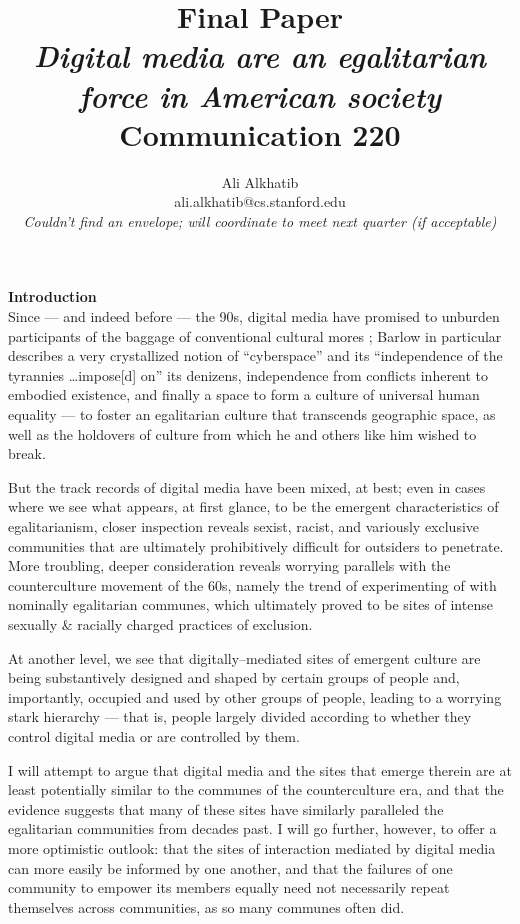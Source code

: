 \documentclass[11pt,titlepage]{article}
\author{
  Ali Alkhatib\\
  ali.alkhatib@cs.stanford.edu\\
  \textit{Couldn't find an envelope; will coordinate to meet next quarter (if acceptable)}
}
\title{Final Paper\\
\normalsize{
  \textit{Digital media are an egalitarian force in American society}\\
  Communication 220
  }
}
\newcommand{\sectitle}[1]{\textbf{#1}\\}
\begin{document}
\maketitle

\sectitle{Introduction}
Since --- and indeed before ---
the 90s, digital media have promised to unburden participants of the baggage of conventional cultural mores
\cite{barlow2009declaration};
Barlow in particular describes a very crystallized notion of
``cyberspace'' and its ``independence of the tyrannies \dots impose[d] on'' its denizens,
independence from conflicts inherent to embodied existence,
and finally a space to form a culture of universal human equality ---
to foster an egalitarian culture that transcends geographic space,
as well as the holdovers of culture from which he and others like him wished to break.

But the track records of digital media have been mixed, at best;
even in cases where we see what appears,
at first glance,
to be the emergent characteristics of egalitarianism,
closer inspection reveals sexist, racist, and variously exclusive
communities that are ultimately prohibitively difficult for outsiders to penetrate.
More troubling,
deeper consideration reveals worrying parallels with the counterculture movement of the 60s,
namely the trend of experimenting of with nominally egalitarian communes,
which ultimately proved to be sites of intense sexually \& racially charged practices of exclusion.

At another level, we see that digitally--mediated sites of emergent culture
are being substantively designed and shaped by certain groups of people and,
importantly,
occupied and used by other groups of people, leading to a worrying stark hierarchy ---
that is, people largely divided according to whether
they control digital media or are controlled by them.

I will attempt to argue that
digital media and the sites that emerge therein are
at least potentially
similar to the communes of the counterculture era,
and that the evidence suggests that
many of these sites have similarly paralleled the egalitarian communities from decades past.
I will go further, however, to offer a more optimistic outlook:
that the sites of interaction mediated by digital media can more easily be informed by one another,
and that the failures of one community to empower its members equally
need not necessarily repeat themselves across communities,
as so many communes often did.
\end{document}
